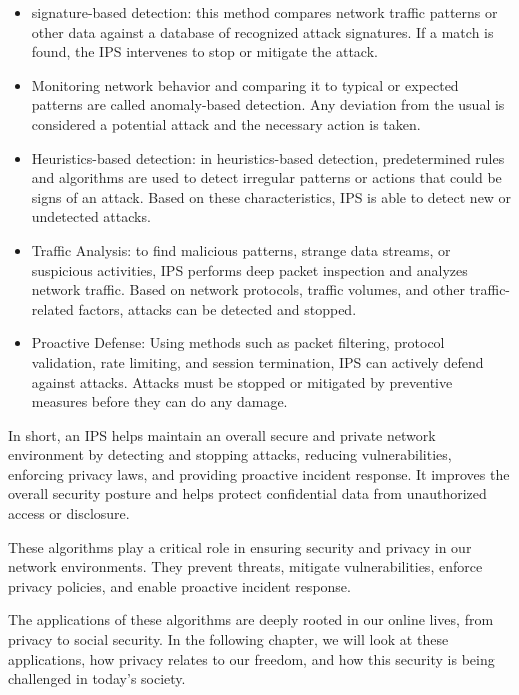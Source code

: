 \documentclass[a4paper,12pt]{report}
\begin{document}
\begin{itemize}

\item signature-based detection: this method compares network traffic patterns or other data against a database of recognized attack signatures. If a match is found, the IPS intervenes to stop or mitigate the attack.

\item Monitoring network behavior and comparing it to typical or expected patterns are called anomaly-based detection. Any deviation from the usual is considered a potential attack and the necessary action is taken.

\item Heuristics-based detection: in heuristics-based detection, predetermined rules and algorithms are used to detect irregular patterns or actions that could be signs of an attack. Based on these characteristics, IPS is able to detect new or undetected attacks.

\item Traffic Analysis: to find malicious patterns, strange data streams, or suspicious activities, IPS performs deep packet inspection and analyzes network traffic. Based on network protocols, traffic volumes, and other traffic-related factors, attacks can be detected and stopped.

\item Proactive Defense: Using methods such as packet filtering, protocol validation, rate limiting, and session termination, IPS can actively defend against attacks. Attacks must be stopped or mitigated by preventive measures before they can do any damage.

\end{itemize}

In short, an IPS helps maintain an overall secure and private network environment by detecting and stopping attacks, reducing vulnerabilities, enforcing privacy laws, and providing proactive incident response. It improves the overall security posture and helps protect confidential data from unauthorized access or disclosure.

These algorithms play a critical role in ensuring security and privacy in our network environments. They prevent threats, mitigate vulnerabilities, enforce privacy policies, and enable proactive incident response.

The applications of these algorithms are deeply rooted in our online lives, from privacy to social security. In the following chapter, we will look at these applications, how privacy relates to our freedom, and how this security is being challenged in today's society.
\end{document}
